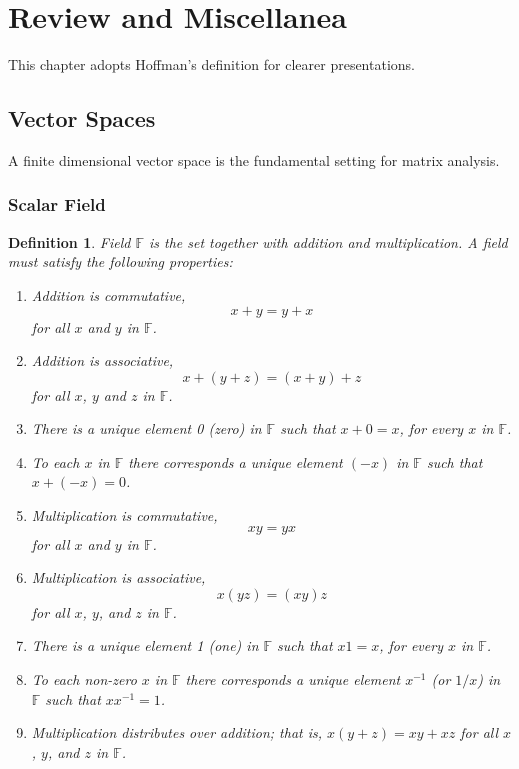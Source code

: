\documentclass{article}
\newtheorem*{definition}{Definition}
\begin{document}
    \section{Review and Miscellanea}
    This chapter adopts Hoffman's definition for clearer presentations.
    \subsection{Vector Spaces}
    A finite dimensional vector space is the fundamental setting for matrix analysis.
    \subsubsection{Scalar Field}
    \begin{definition}
        Field \(\mathbb{F}\) is the set together with addition and
        multiplication. A field must satisfy the following properties:
        \begin{enumerate}
            \item Addition is commutative, \[x+y=y+x\] for all \(x\) and \(y\) in \(\mathbb{F}\).
            \item Addition is associative, \[x+(y+z)=(x+y)+z\] for all \(x\), \(y\) and \(z\) in \(\mathbb{F}\).
            \item There is a unique element 0 (zero) in \(\mathbb{F}\) such that \(x+0=x\), for every \(x\) in \(\mathbb{F}\).
            \item To each \(x\) in \(\mathbb{F}\) there corresponds a unique element \((-x)\) in \(\mathbb{F}\) such that \(x + (-x) = 0\).
            \item Multiplication is commutative, \[xy=yx\] for all \(x\) and \(y\) in \(\mathbb{F}\).
            \item Multiplication is associative, \[x(yz)=(xy)z\] for all \(x\), \(y\), and \(z\) in \(\mathbb{F}\).
            \item There is a unique element 1 (one) in \(\mathbb{F}\) such that \(x1=x\), for every \(x\) in \(\mathbb{F}\).
            \item To each non-zero \(x\) in \(\mathbb{F}\) there corresponds a unique element \(x^{-1}\) (or \(1/x\)) in \(\mathbb{F}\) such that \(xx^{-1}=1\).
            \item Multiplication distributes over addition; that is, \(x(y+z)=xy+xz\) for all \(x\), \(y\), and \(z\) in \(\mathbb{F}\).
        \end{enumerate}
    \end{definition}
\end{document}
